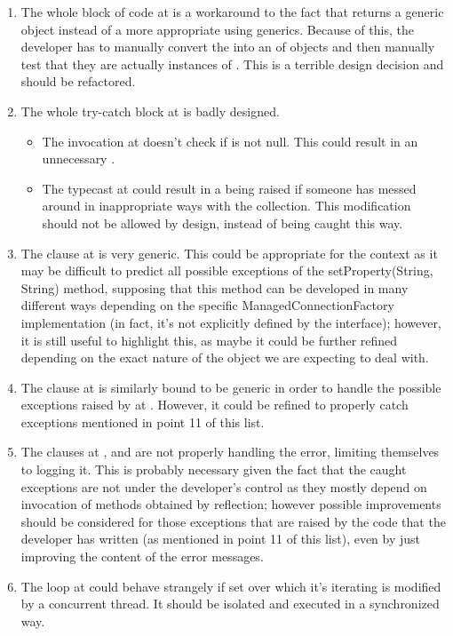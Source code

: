 \begin{enumerate}
	\item {} The whole block of code at  is a workaround to the fact that  returns a generic  object instead of a more appropriate  using generics. Because of this, the developer has to manually convert the  into an  of  objects and then manually test that they are actually instances of . This is a terrible design decision and should be refactored.  
	\item {} The whole try-catch block at  is badly designed. 
		\begin{itemize}
			\item The invocation  at  doesn't check if  is not null. This could result in an unnecessary . 
			\item The typecast at  could result in a  being raised if someone has messed around in inappropriate ways with the  collection. This modification should not be allowed by design, instead of being caught this way. 
		\end{itemize}
	\item {} The  clause at  is very generic. This could be appropriate for the context as it may be difficult to predict all possible exceptions of the setProperty(String, String) method, supposing that this method can be developed in many different ways depending on the specific ManagedConnectionFactory implementation (in fact, it's not explicitly defined by the interface); however, it is still useful to highlight this, as maybe it could be further refined depending on the exact nature of the object we are expecting to deal with. 
	\item {} The  clause at  is similarly bound to be generic in order to handle the possible exceptions raised by  at . However, it could be refined to properly catch exceptions mentioned in point 11 of this list. 
	\item {} The  clauses at ,  and  are not properly handling the error, limiting themselves to logging it. This is probably necessary given the fact that the caught exceptions are not under the developer's control as they mostly depend on invocation of methods obtained by reflection; however possible improvements should be considered for those exceptions that are raised by the code that the developer has written (as mentioned in point 11 of this list), even by just improving the content of the error messages. 
	\item {} The  loop at  could behave strangely if set over which it's iterating is modified by a concurrent thread. It should be isolated and executed in a synchronized way. 
	\end{enumerate}
	
